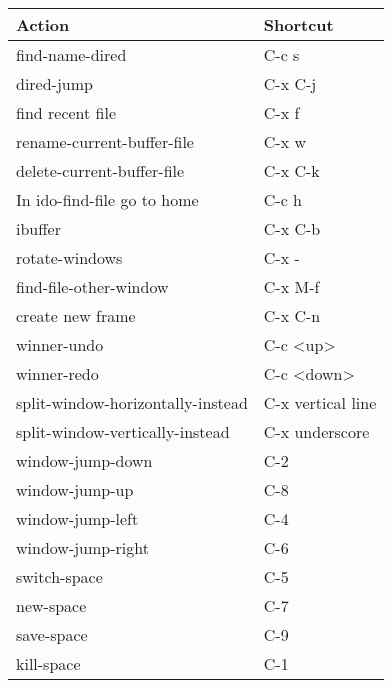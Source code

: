 \documentclass[english]{rcalibrionecolumn}
\begin{document}
\begin{center}
\begin{tabular}{ll}
 \textbf{Action}                    &  \textbf{Shortcut}  \\
\hline
 find-name-dired                    &  C-c s              \\
 dired-jump                         &  C-x C-j            \\
 find recent file                   &  C-x f              \\
 rename-current-buffer-file         &  C-x w              \\
 delete-current-buffer-file         &  C-x C-k            \\
 In ido-find-file go to home        &  C-c h              \\
\hline
 ibuffer                            &  C-x C-b            \\
\hline
 rotate-windows                     &  C-x -              \\
 find-file-other-window             &  C-x M-f            \\
\hline
 create new frame                   &  C-x C-n            \\
\hline
 winner-undo                        &  C-c <up>           \\
 winner-redo                        &  C-c <down>         \\
\hline
 split-window-horizontally-instead  &  C-x vertical line  \\
 split-window-vertically-instead    &  C-x underscore     \\
\hline
 window-jump-down                   &  C-2                \\
 window-jump-up                     &  C-8                \\
 window-jump-left                   &  C-4                \\
 window-jump-right                  &  C-6                \\
\hline
 switch-space                       &  C-5                \\
 new-space                          &  C-7                \\
 save-space                         &  C-9                \\
 kill-space                         &  C-1                \\
\end{tabular}
\end{center}
\end{document}
